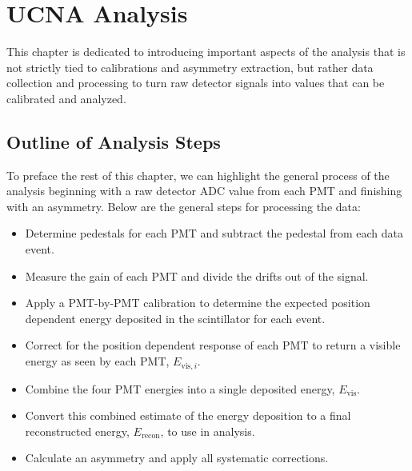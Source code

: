 \chapter{UCNA Analysis}
\label{ch:UCNA_Analysis}

This chapter is dedicated to introducing important aspects of the analysis that
is not strictly tied to calibrations and asymmetry extraction, but rather
data collection and processing to turn raw detector signals into values that
can be calibrated and analyzed. 






\section{Outline of Analysis Steps} \label{sec:outline}

To preface the rest of this chapter, we can highlight
the general process of the analysis beginning with a raw detector
ADC value from each PMT and finishing with an asymmetry.
Below are the general steps for processing the data:

\begin{itemize}
\item Determine pedestals for each PMT and subtract the pedestal from each data event.
\item Measure the gain of each PMT and divide the drifts out of the signal.
\item Apply a PMT-by-PMT calibration to determine the expected position dependent
  energy deposited in the scintillator
  for each event.
\item Correct for the position dependent response of each PMT
  to return a visible energy as seen by each PMT, $E_{\mathrm{vis},i}$.
\item Combine the four PMT energies into a single deposited energy, $E_{\mathrm{vis}}$.
\item Convert this combined estimate of the energy deposition to a final
  reconstructed energy, $E_{\mathrm{recon}}$, to use in analysis.
\item Calculate an asymmetry and apply all systematic corrections.
\end{itemize}

